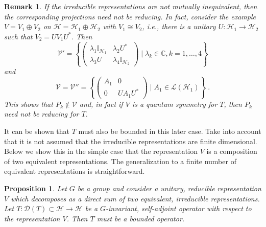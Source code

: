 \documentclass[a4paper,12pt]{amsart}
\renewcommand{\H}{\mathcal{H}}
\newcommand{\D}{\mathcal{D}}
\newcommand{\1}{\mathbb{I}}
\newtheorem{proposition}[theorem]{Proposition}
\newtheorem{remark}[theorem]{Remark}
\numberwithin{equation}{section}
\numberwithin{theorem}{section}
\begin{document}
\begin{remark}
If the irreducible representations are not mutually inequivalent, then the corresponding projections need not be reducing.
In fact, consider the example $V=V_1\oplus V_2$ on $\H=\H_1\oplus \H_2$ with $V_1\cong V_2$, i.e., there is a unitary
$U\colon\H_1\to\H_2$ such that $V_2=UV_1U^*$. Then 
\[
 \mathcal{V}'=\left\{
                \begin{pmatrix}
                  \lambda_1 \1_{\mathcal{H}_1} &  \lambda_2 U^* \\
                  \lambda_3 U  & \lambda_4 \1_{\mathcal{H}_2} 
                \end{pmatrix}
                 \mid \lambda_k\in\mathbb{C}, k=1,\dots,4
              \right\}
\] and 
\[
\mathcal{V}=\mathcal{V}''=
               \left\{
                \begin{pmatrix}
                  A_1 &  0 \\
                  0   & UA_1U^* 
                \end{pmatrix}
                 \mid A_1\in\mathcal{L}(\H_1)
              \right\}\;.
\]
This shows that $P_k\notin\mathcal{V}$ and, in fact if $V$ is a quantum symmetry for $T$, then $P_k$ need not be reducing for $T$.
\end{remark}

It can be shown that $T$ must also be bounded in this later case. Take into account that it is not assumed that the irreducible 
representations are finite dimensional. Below we show this in the simple case that the representation $V$ is a composition of 
two equivalent representations. The generalization to a finite number of equivalent representations is straightforward.

\begin{proposition}\label{prop:equivalentirrep}
Let $G$ be a group and consider a unitary, reducible representation $V$ which decomposes as a direct sum of two equivalent, irreducible representations. 
Let $T\colon \D(T)\subset\H\to\H$ be a $G$-invariant, self-adjoint operator with respect to the representation $V$. Then $T$ 
must be a bounded operator.
\end{proposition}
\end{document}
